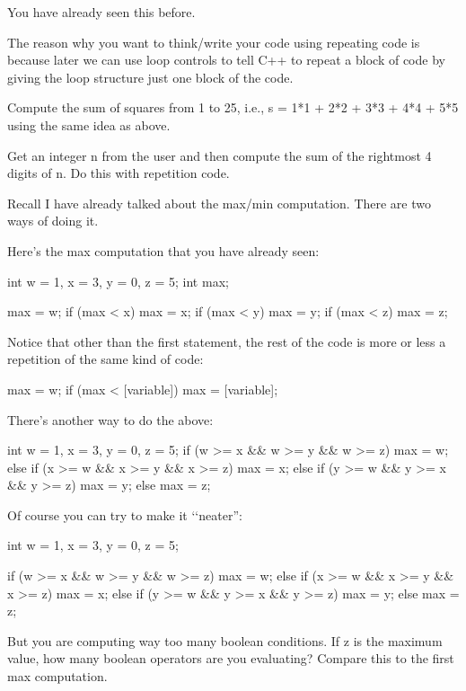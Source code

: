 You have already seen this before.

The reason why you want to think/write your code using repeating code is
because later we can use loop controls to tell C++ to repeat a block of
code by giving the loop structure just one block of the code.

\begin{ex}
Compute the sum of squares from 1 to 25, i.e., s =
1*1 + 2*2 + 3*3 + 4*4 + 5*5 using the same idea as above.
\end{ex}
\begin{ex}
Get an integer n from the user and then compute the
sum of the rightmost 4 digits of n. Do this with repetition code.
\end{ex}
\newpage{}

Recall I have already talked about the max/min computation. There are
two ways of doing it.

Here's the max computation that you have already seen:
\begin{console}
int w = 1, x = 3, y = 0, z = 5;
int max;

max = w;
if (max < x)
   max = x;
if (max < y)
   max = y;
if (max < z)
   max = z; 
\end{console}

Notice that other than the first statement, the rest of the code is more
or less a repetition of the same kind of code:
\begin{console}
max = w;
if (max < [variable])
   max = [variable]; 
\end{console}

There's another  way to do the above:
\begin{console}
int w = 1, x = 3, y = 0, z = 5;
if (w >= x && w >= y && w >= z)
    max = w;
else
{
     if (x >= w && x >= y && x >= z)
         max = x;
     else
     {
        if (y >= w && y >= x && y >= z)
            max = y;
        else
            max = z;
      }
}
\end{console}

Of course you can try to make it \lq\lq neater'':
\begin{console}
int w = 1, x = 3, y = 0, z = 5;

if (w >= x && w >= y && w >= z)
    max = w;
else if (x >= w && x >= y && x >= z)
    max = x;
else if (y >= w && y >= x && y >= z)
    max = y;
else
    max = z;
\end{console}

But you are computing way too many boolean conditions. If z is the
maximum value, how many boolean operators are you evaluating? Compare
this to the first max computation.

